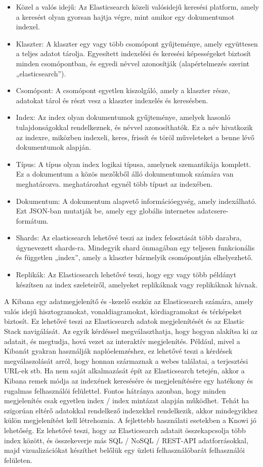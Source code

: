 \begin{itemize}
	\item Közel a valós idejű: Az Elasticsearch közeli valósidejű keresési platform, amely a keresést olyan gyorsan hajtja végre, mint amikor egy dokumentumot indexel.
	\item Klaszter: A klaszter egy vagy több csomópont gyűjteménye, amely együttesen a teljes adatot tárolja. Egyesített indexelési és keresési képességeket biztosít minden csomópontban, és egyedi névvel azonosítják (alapértelmezés szerint „elasticsearch”).
	\item Csomópont: A csomópont egyetlen kiszolgáló, amely a klaszter része, adatokat tárol és részt vesz a klaszter indexelés és keresésben.
	\item Index: Az index olyan dokumentumok gyűjteménye, amelyek hasonló tulajdonságokkal rendelkeznek, és névvel azonosíthatók. Ez a név hivatkozik az indexre, miközben indexeli, keres, frissít és töröl műveleteket a benne lévő dokumentumok alapján.
	\item Típus: A típus olyan index logikai típusa, amelynek szemantikája komplett. Ez a dokumentum a közös mezőkből álló dokumentumok számára van meghatározva. meghatározhat egynél több típust az indexében.
	\item Dokumentum: A dokumentum alapvető információegység, amely indexálható. Ezt JSON-ban mutatják be, amely egy globális internetes adatcsere-formátum.
	\item Shards: Az elasticsearch lehetővé teszi az index felosztását több darabra, úgynevezett shards-ra. Mindegyik shard önmagában egy teljesen funkcionális és független „index”, amely a klaszter bármelyik csomópontján elhelyezhető.
	\item Replikák: Az Elasticsearch lehetővé teszi, hogy egy vagy több példányt készítsen az index szeleteiről, amelyeket replikáknak vagy replikáknak hívnak.
\end{itemize}

A Kibana egy adatmegjelenítő és -kezelő eszköz az Elasticsearch számára, amely valós idejű hisztogramokat, vonaldiagramokat, kördiagramokat és térképeket biztosít. Ez lehetővé teszi az Elasticsearch adatok megjelenítését és az Elastic Stack navigálását. Az egyik kérdéssel megválaszthatja, hogy hogyan alakítsa ki az adatait, és megtudja, hová vezet az interaktív megjelenítés. Például, mivel a Kibanát gyakran használják naplóelemzéshez, ez lehetővé teszi a kérdések megválaszolását arról, hogy honnan származnak a webes találatai, a terjesztési URL-ek stb. Ha nem saját alkalmazását épít az Elasticsearch tetején, akkor a Kibana remek módja az indexének keresésére és megjelenítésére egy hatékony és rugalmas felhasználói felülettel. Fontos hátránya azonban, hogy minden megjelenítés csak egyetlen index / index mintázat alapján működhet. Tehát ha szigorúan eltérő adatokkal rendelkező indexekkel rendelkezik, akkor mindegyikhez külön megjelenítést kell létrehoznia. A fejlettebb használati esetekben a Knowi jó lehetőség. Ez lehetővé teszi, hogy az Elasticsearch adatait összekapcsolja több index között, és összekeverje más SQL / NoSQL / REST-API adatforrásokkal, majd vizualizációkat készíthet belőlük egy üzleti felhasználóbarát felhasználói felületen.

